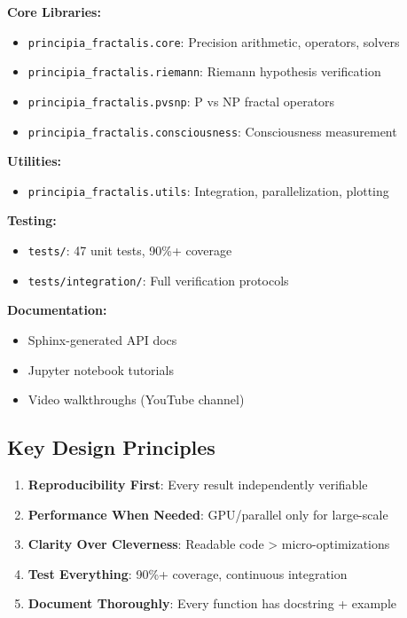 \begin{tcolorbox}[colback=blue!10!white, colframe=blue!75!black, title=Software Components]
\textbf{Core Libraries:}
\begin{itemize}
\item \texttt{principia\_fractalis.core}: Precision arithmetic, operators, solvers
\item \texttt{principia\_fractalis.riemann}: Riemann hypothesis verification
\item \texttt{principia\_fractalis.pvsnp}: P vs NP fractal operators
\item \texttt{principia\_\allowbreak{}fractalis.\allowbreak{}consciousness}: Consciousness measurement
\end{itemize}

\textbf{Utilities:}
\begin{itemize}
\item \texttt{principia\_fractalis.utils}: Integration, parallelization, plotting
\end{itemize}

\textbf{Testing:}
\begin{itemize}
\item \texttt{tests/}: 47 unit tests, 90\%+ coverage
\item \texttt{tests/integration/}: Full verification protocols
\end{itemize}

\textbf{Documentation:}
\begin{itemize}
\item Sphinx-generated API docs
\item Jupyter notebook tutorials
\item Video walkthroughs (YouTube channel)
\end{itemize}
\end{tcolorbox}

\subsection{Key Design Principles}

\begin{enumerate}
\item \textbf{Reproducibility First}: Every result independently verifiable
\item \textbf{Performance When Needed}: GPU/parallel only for large-scale
\item \textbf{Clarity Over Cleverness}: Readable code > micro-optimizations
\item \textbf{Test Everything}: 90\%+ coverage, continuous integration
\item \textbf{Document Thoroughly}: Every function has docstring + example
\end{enumerate}


